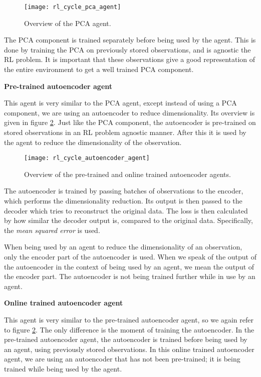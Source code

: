 \begin{figure}[h]
    \centering
    \texttt{[image: rl\_cycle\_pca\_agent]}
    \caption{Overview of the PCA agent.}
    \label{fig:rl_cycle_pca}
\end{figure}

The PCA component is trained separately before being used by the agent. This is done by training the PCA on previously stored observations, and is agnostic the RL problem. It is important that these observations give a good representation of the entire environment to get a well trained PCA component. \newline \par

\noindent \textbf{Pre-trained autoencoder agent} \par
\noindent This agent is very similar to the PCA agent, except instead of using a PCA component, we are using an autoencoder to reduce dimensionality. Its overview is given in figure \ref{fig:rl_cycle_ae}. Just like the PCA component, the autoencoder is pre-trained on stored observations in an RL problem agnostic manner. After this it is used by the agent to reduce the dimensionality of the observation. 

\begin{figure}[h]
    \centering
    \texttt{[image: rl\_cycle\_autoencoder\_agent]}
    \caption{Overview of the pre-trained and online trained autoencoder agents.}
    \label{fig:rl_cycle_ae}
\end{figure}

The autoencoder is trained by passing batches of observations to the encoder, which performs the dimensionality reduction. Its output is then passed to the decoder which tries to reconstruct the original data. The loss is then calculated by how similar the decoder output is, compared to the original data. Specifically, the \emph{mean squared error} is used.

When being used by an agent to reduce the dimensionality of an observation, only the encoder part of the autoencoder is used. When we speak of the output of the autoencoder in the context of being used by an agent, we mean the output of the encoder part. The autoencoder is not being trained further while in use by an agent.\newline \par

\noindent \textbf{Online trained autoencoder agent} \par
\noindent  This agent is very similar to the pre-trained autoencoder agent, so we again refer to figure \ref{fig:rl_cycle_ae}. The only difference is the moment of training the autoencoder. In the pre-trained autoencoder agent, the autoencoder is trained before being used by an agent, using previously stored observations. In this online trained autoencoder agent, we are using an autoencoder that has not been pre-trained; it is being trained while being used by the agent. 

